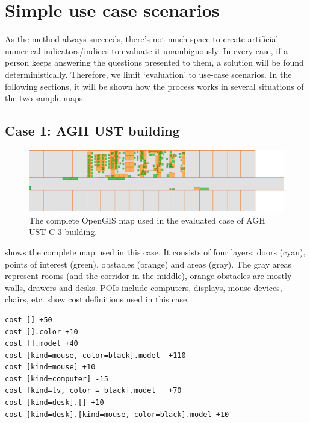 \chapter{Simple use case scenarios}
\label{cha:examples}

As the method always succeeds, there's not much space to create artificial numerical indicators/indices to evaluate it unambiguously. In every case, if a person keeps answering the questions presented to them, a solution will be found deterministically. Therefore, we limit `evaluation' to use-case scenarios. In the following sections, it will be shown how the process works in several situations of the two sample maps.

\section{Case 1: AGH UST building}
\label{sec:case-agh}

\begin{figure}
	\centering
	\includegraphics[width=\textwidth]{case-agh-complete}
	\caption{The complete OpenGIS map used in the evaluated case of AGH UST C-3 building.}
	\label{fig:case-agh-complete}
\end{figure}

 shows the complete map used in this case. It consists of four layers: doors (cyan), points of interest (green), obstacles (orange) and areas (gray). The gray areas represent rooms (and the corridor in the middle), orange obstacles are mostly walls, drawers and desks. POIs include computers, displays, mouse devices, chairs, etc.  show cost definitions used in this case.

\begin{lstlisting}[caption={Costs definitions used in the evaluated case..},label=lst:case-agh-costs]
cost [] +50
cost [].color +10
cost [].model +40
cost [kind=mouse, color=black].model  +110
cost [kind=mouse] +10
cost [kind=computer] -15
cost [kind=tv, color = black].model   +70
cost [kind=desk].[] +10
cost [kind=desk].[kind=mouse, color=black].model +10
\end{lstlisting}

